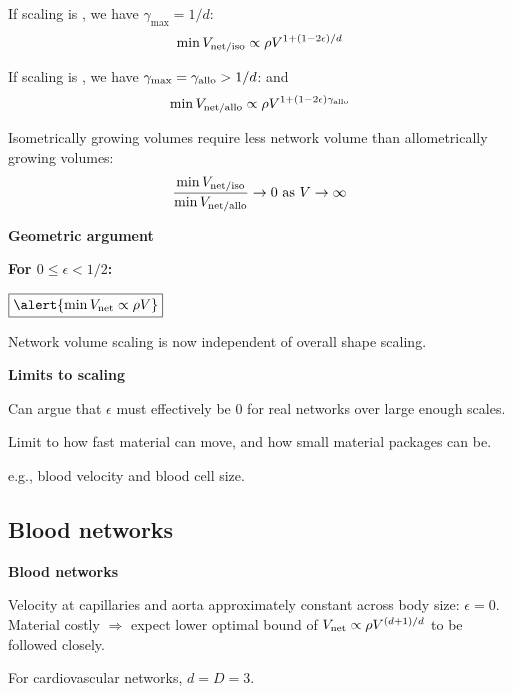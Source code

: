       If scaling is , we have $\gamma_{\max} = 1/d$:
      $$
      \min V_{\textnormal{net/iso}} 
      \propto
      \rho V^{1+(1-2\epsilon)/d}
      $$
     
      If scaling is , we have
      $\gamma_{\max} = \gamma_{\textnormal{allo}} > 1/d$:
      and 
      $$
      \min V_{\textnormal{net/allo}} 
      \propto
      \rho V^{1+(1-2\epsilon)\gamma_{\textnormal{allo}}}
      $$
     
      Isometrically growing volumes 
      \alert{require less network volume} 
      than allometrically growing volumes:
      $$
      \frac{\min V_{\textnormal{net/iso}}}{\min V_{\textnormal{net/allo}}} \rightarrow 0 
      \mbox{\ as $V \rightarrow \infty$}
      $$
        
  

  \textbf{Geometric argument}

  \textbf{For $0 \le \epsilon < 1/2$:}
    
     
      $
      \boxed{\alert{
          \min V_{\textnormal{net}} 
          \propto
          \rho V
        }}
      $
     
      Network volume scaling is now independent 
      of overall shape scaling.
    
  

  \medskip

  \textbf{Limits to scaling}
    
     
      Can argue that $\epsilon$ must effectively be 0
      for real networks over large enough scales.
     
      Limit to how fast material can move,
      and how small material packages can be.
     
      e.g., blood velocity and blood cell size.
    
  


\subsection{Blood networks}

  \textbf{Blood networks}

  
   Velocity at capillaries and 
    aorta approximately constant across body size\cite{weinstein2006a}: 
    $\epsilon = 0$.
   \alert{Material costly} $\Rightarrow$ expect lower optimal bound of 
    $V_{\textnormal{net}} \propto \rho V^{(d+1)/d}$ to be followed closely.
  
    For cardiovascular networks, \alert{$d=D=3$}.
  
